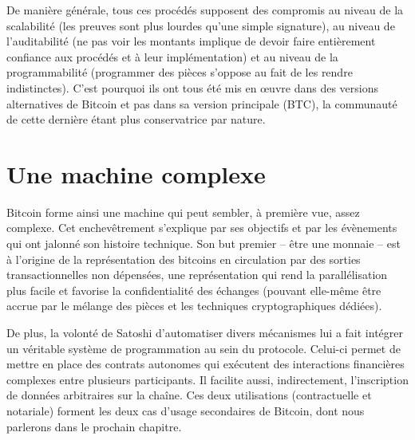 De manière générale, tous ces procédés supposent des compromis au niveau de la scalabilité (les preuves sont plus lourdes qu'une simple signature), au niveau de l'auditabilité (ne pas voir les montants implique de devoir faire entièrement confiance aux procédés et à leur implémentation) et au niveau de la programmabilité (programmer des pièces s'oppose au fait de les rendre indistinctes). C'est pourquoi ils ont tous été mis en œuvre dans des versions alternatives de Bitcoin et pas dans sa version principale (BTC), la communauté de cette dernière étant plus conservatrice par nature.

\section*{Une machine complexe}

Bitcoin forme ainsi une machine qui peut sembler, à première vue, assez complexe. Cet enchevêtrement s'explique par ses objectifs et par les évènements qui ont jalonné son histoire technique. Son but premier -- être une monnaie -- est à l'origine de la représentation des bitcoins en circulation par des sorties transactionnelles non dépensées, une représentation qui rend la parallélisation plus facile et favorise la confidentialité des échanges (pouvant elle-même être accrue par le mélange des pièces et les techniques cryptographiques dédiées).

De plus, la volonté de Satoshi d'automatiser divers mécanismes lui a fait intégrer un véritable système de programmation au sein du protocole. Celui-ci permet de mettre en place des contrats autonomes qui exécutent des interactions financières complexes entre plusieurs participants. Il facilite aussi, indirectement, l'inscription de données arbitraires sur la chaîne. Ces deux utilisations (contractuelle et notariale) forment les deux cas d'usage secondaires de Bitcoin, dont nous parlerons dans le prochain chapitre.